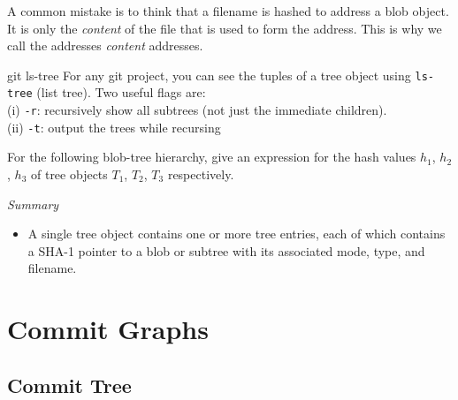 \frmrule 



\begin{example}


\end{example}


\frmrule 



A common mistake is to think that a filename is 
hashed to address a blob object. It is only the \textit{content} of the 
file that is used to form the address. This is why we call the addresses 
\textit{content} addresses.



\begin{sidenote}{git ls-tree}
For any git project, you can 
see the tuples of a tree object using \lstinline{ls-tree} (list tree). 
Two useful flags are:\\
(i) \lstinline{-r}: recursively show all subtrees (not just 
the immediate children). \\
(ii) \lstinline{-t}: output the trees while recursing 
\end{sidenote}


\frmrule 

\begin{example}
For the following blob-tree hierarchy, give an expression for 
the hash values $h_1$, $h_2$, $h_3$ of tree objects $T_1$, $T_2$, 
$T_3$ respectively. 
\end{example}

\frmrule

\textit{Summary}
\begin{itemize}
\item A single tree object contains one or more tree entries, each of which contains a SHA-1 pointer to a blob or subtree with its associated mode, type, and filename.
\end{itemize}

\chapter{Commit Graphs}

\section{Commit Tree}


